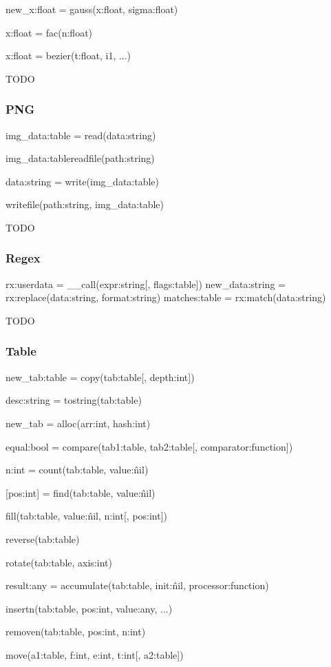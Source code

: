 new\_x:float = gauss(x:float, sigma:float)

x:float = fac(n:float)

x:float = bezier(t:float, i1, ...)

TODO

\subsubsection{PNG}
\label{sec:png}

img\_data:table = read(data:string)

img\_data:tablereadfile(path:string)

data:string = write(img\_data:table)

writefile(path:string, img\_data:table)

TODO

\subsubsection{Regex}
\label{sec:regex}

rx:userdata = \_\_call(expr:string[, flags:table])
new\_data:string = rx:replace(data:string, format:string)
matches:table = rx:match(data:string)

TODO

\subsubsection{Table}
\label{sec:table}

new\_tab:table = copy(tab:table[, depth:int])

desc:string = tostring(tab:table)

new\_tab = alloc(arr:int, hash:int)

equal:bool = compare(tab1:table, tab2:table[, comparator:function])

n:int = count(tab:table, value:\^nil)

[pos:int] = find(tab:table, value:\^nil)

fill(tab:table, value:\^nil, n:int[, pos:int])

reverse(tab:table)

rotate(tab:table, axis:int)

result:any = accumulate(tab:table, init:\^nil, processor:function)

insertn(tab:table, pos:int, value:any, ...)

removen(tab:table, pos:int, n:int)

move(a1:table, f:int, e:int, t:int[, a2:table])

